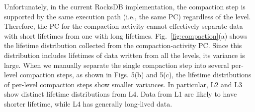 

Unfortunately, in the current RocksDB implementation, the compaction step is supported 
by the same execution path (i.e., the same PC) regardless of the level.
Therefore, the PC for the compaction activity cannot effectively separate data with 
short lifetimes from one with long lifetimes.
Fig.~\ref{fig:compaction}(a) shows 
the lifetime distribution collected from the compaction-activity PC.  
Since this distribution includes lifetimes of data written from all the levels, 
its variance is large.  
When we manually separate the single compaction step into several per-level compaction steps, 
as shown in Figs. 5(b) and 5(c), the lifetime distributions of per-level compaction steps 
show smaller variances.   
In particular, L2 and L3 show distinct lifetime distributions from L4.
Data from L1 are likely to have shorter lifetime, while L4 has generally
long-lived data.


